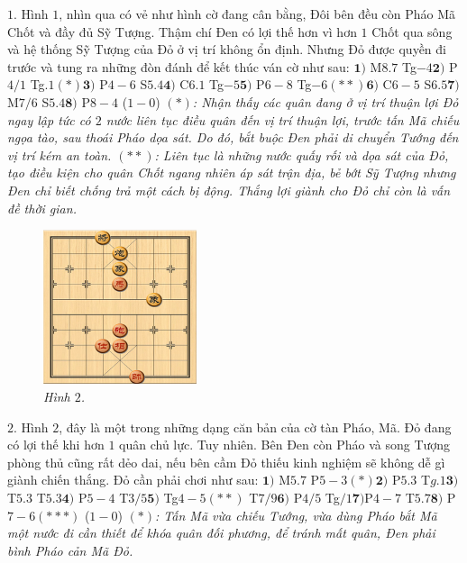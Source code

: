 \begin{multicols}{2}
	$1.$ Hình $1$, nhìn qua có vẻ như hình cờ đang cân bằng, Đôi bên đều còn Pháo Mã Chốt và đầy đủ Sỹ Tượng. Thậm chí Đen có lợi thế hơn vì hơn $1$ Chốt qua sông và hệ thống Sỹ Tượng của Đỏ ở vị trí không ổn định. Nhưng Đỏ được quyền đi trước và tung ra những đòn đánh để kết thúc ván cờ như sau:
	\vskip 0.1cm
	$\pmb{1)}$ M$8.7$ Tg$-4$\quad $\pmb{2)}$ P$4/1$ Tg$.1$$(*)$\quad $\pmb{3)}$ P$4-6$ S$5.4$\quad $\pmb{4)}$ C$6.1$ Tg$-5$\quad $\pmb{5)}$ P$6-8$ Tg$-6$$(**)$\quad $\pmb{6)}$ C$6-5$ S$6.5$\quad $\pmb{7)}$ M$7/6$ S$5.4$\quad $\pmb{8)}$ P$8-4$ ($1-0$)
	\vskip 0.1cm
	\textit{$(*)$: Nhận thấy các quân đang ở vị trí thuận lợi Đỏ ngay lập tức có $2$ nước liên tục điều quân đến vị trí thuận lợi, trước tấn Mã chiếu ngọa tào, sau thoái Pháo dọa sát. Do đó, bắt buộc Đen phải di chuyển  Tướng đến vị trí kém an toàn.
	\vskip 0.1cm
	$(**)$: Liên tục là những nước quấy rối và dọa sát của Đỏ, tạo điều kiện cho quân Chốt ngang nhiên áp sát trận địa, bẻ bớt Sỹ Tượng nhưng Đen chỉ biết chống trả một cách bị động. Thắng lợi giành cho Đỏ chỉ còn là vấn đề thời gian. }
	\begin{figure}[H]
		\centering
		\vspace*{-5pt}
		\captionsetup{labelformat= empty, justification=centering}
		\includegraphics[width=0.4\textwidth]{2}
		\caption{\small\textit{\color{gocco}Hình $2$.}}
		\vspace*{-10pt}
	\end{figure}
	$2$. Hình $2$, đây là một trong những dạng căn bản của cờ tàn Pháo, Mã. Đỏ đang có lợi thế khi hơn $1$ quân chủ lực. Tuy nhiên. Bên Đen còn Pháo và song Tượng phòng thủ cũng rất dẻo dai, nếu bên cầm Đỏ thiếu kinh nghiệm sẽ không dễ gì giành chiến thắng. Đỏ cần phải chơi như sau:
	\vskip 0.1cm 
	$\pmb{1)}$	M$5.7$ P$5-3$$(*)$\quad $\pmb{2)}$ P$5.3$ T$g.1$\quad $\pmb{3)}$ T$5.3$ T$5.3$\quad  $\pmb{4)}$ P$5-4$ T$3/5$\quad $\pmb{5)}$ Tg$4-5$$(**)$ T$7/9$\quad $\pmb{6)}$ P$4/5$ Tg$/1$\quad $\pmb{7)}$P$4-7$ T$5.7$\quad $\pmb{8)}$ P$7-6$$(***)$ ($1-0$)
	\vskip 0.1cm
	\textit{$(*)$: Tấn Mã vừa chiếu Tướng, vừa dùng Pháo bắt Mã một nước đi cần thiết để khóa quân đối phương, để tránh mất quân, Đen phải bình Pháo cản Mã Đỏ.
}$$
\end{multicols}
